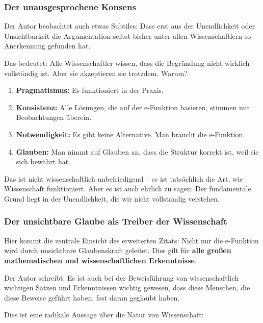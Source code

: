 \documentclass[a4paper, 12pt, twoside, openright]{report}
\theoremstyle{definition}
\theoremstyle{definition}
\begin{document}
\subsubsection*{Der unausgesprochene Konsens}

Der Autor beobachtet auch etwas Subtiles: Dass erst aus der Unendlichkeit oder Unsichtbarkeit die Argumentation selbst bisher unter allen Wissenschaftlern so Anerkennung gefunden hat.

Das bedeutet: Alle Wissenschaftler wissen, dass die Begründung nicht wirklich vollständig ist. Aber sie akzeptieren sie trotzdem. Warum?

\begin{enumerate}
	\item \textbf{Pragmatismus:} Es funktioniert in der Praxis.
	
	\item \textbf{Konsistenz:} Alle Lösungen, die auf der e-Funktion basieren, stimmen mit Beobachtungen überein.
	
	\item \textbf{Notwendigkeit:} Es gibt keine Alternative. Man braucht die e-Funktion.
	
	\item \textbf{Glauben:} Man nimmt auf Glauben an, dass die Struktur korrekt ist, weil sie sich bewährt hat.
\end{enumerate}

Das ist nicht wissenschaftlich unbefriedigend -- es ist tatsächlich die Art, wie Wissenschaft funktioniert. Aber es ist auch ehrlich zu sagen: Der fundamentale Grund liegt in der Unendlichkeit, die wir nicht vollständig verstehen.

\subsubsection*{Der unsichtbare Glaube als Treiber der Wissenschaft}

Hier kommt die zentrale Einsicht des erweiterten Zitats: Nicht nur die e-Funktion wird durch unsichtbare Glaubenskraft geleitet. Dies gilt für \textbf{alle großen mathematischen und wissenschaftlichen Erkenntnisse}.

Der Autor schreibt: Es ist auch bei der Beweisführung von wissenschaftlich wichtigen Sätzen und Erkenntnissen wichtig gewesen, dass diese Menschen, die diese Beweise geführt haben, fest daran geglaubt haben.

Dies ist eine radikale Aussage über die Natur von Wissenschaft:
\end{document}
